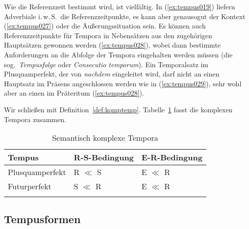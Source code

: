 
Wie die Referenzzeit bestimmt wird, ist vielfältig.
In (\ref{ex:tempus019}) liefern Adverbiale i.\,w.\,S.\ die Referenzzeitpunkte, es kann aber genausogut der Kontext (\ref{ex:tempus027}) oder die Äußerungssituation sein.
Es können auch Referenzzeitpunkte für Tempora in Nebensätzen aus den zugehörigen Hauptsätzen gewonnen werden (\ref{ex:tempus028}), wobei dann bestimmte Anforderungen an die Abfolge der Tempora eingehalten werden müssen (die sog.\ \textit{Tempusfolge} oder \textit{Consecutio temporum}).
Ein Temporalsatz im Plusquamperfekt, der von \textit{nachdem} eingeleitet wird, darf \zB nicht an einen Hauptsatz im Präsens angeschlossen werden wie in (\ref{ex:tempus029}), sehr wohl aber an einen im Präteritum (\ref{ex:tempus028}).

\begin{exe}
  \ex\label{ex:tempus026}
  \begin{xlist}
  \end{xlist}
\end{exe}

Wir schließen mit Definition~\ref{def:komptemp}.
Tabelle~\ref{tab:tempus030} fasst die komplexen Tempora zusammen.


\begin{table}[!htbp]
  \centering
  \begin{tabular}{lll}
    \lsptoprule
    \textbf{Tempus} & \textbf{R-S-Bedingung} & \textbf{E-R-Bedingung} \\
    \midrule
    Plusquamperfekt & R $\ll$ S & E $\ll$ R \\
    Futurperfekt & S $\ll$ R & E $\ll$ R \\
    \lspbottomrule
  \end{tabular}
  \caption{Semantisch komplexe Tempora}
  \label{tab:tempus030}
\end{table}

\subsection{Tempusformen}
\label{sec:tempusformen}

